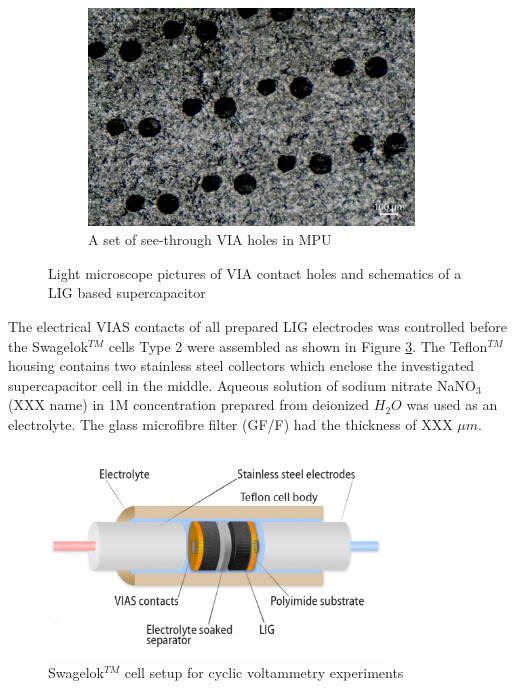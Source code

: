 \begin{figure}[H]
\begin{subfigure}{0.33\textwidth}
\includegraphics[width=0.95\textwidth]{Figures/ExperimentalSetup/FM VIAS contact holes.png}
\captionsetup{width=0.9\linewidth}
\caption{A set of see-through VIA holes in MPU}
\label{fig:FM_VIAS_contact}
\end{subfigure}
\medskip
\caption{Light microscope pictures of VIA contact holes and schematics of a LIG based supercapacitor}
\label{fig:VIAS_Supercapacitor}
\end{figure}

The electrical VIAS contacts of all prepared LIG electrodes was controlled before the Swagelok$^{TM}$ cells Type 2 were assembled as shown in Figure \ref{fig:swagelok_cell}. The Teflon$^{TM}$ housing contains two stainless steel collectors which enclose the investigated supercapacitor cell in the middle. Aqueous solution of sodium nitrate NaNO$_3$ (XXX name) in 1M concentration prepared from deionized $H_2O$ was used as an electrolyte. The glass microfibre filter (GF/F) had the thickness of XXX $\mu m$.
 
\begin{figure}[H]
\centering
\includegraphics[width=0.8\textwidth]{Figures/ExperimentalSetup/Swagok_final.jpg}
\medskip
\caption{Swagelok$^{TM}$ cell setup for cyclic voltammetry experiments}
\label{fig:swagelok_cell}
\end{figure}


